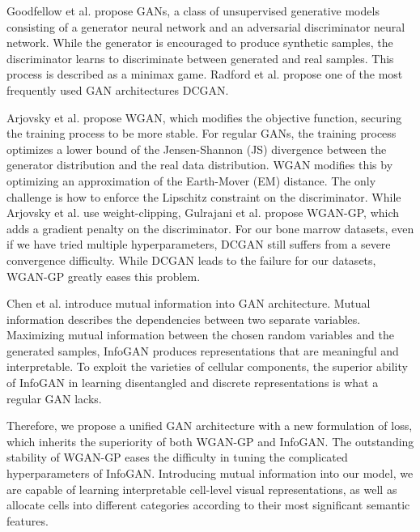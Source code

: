 \documentclass[journal]{IEEEtran}
\begin{document}
Goodfellow et al. \cite{goodfellow2014generative} propose GANs, a class of unsupervised generative models consisting of a generator neural network and an adversarial discriminator neural network. While the generator is encouraged to produce synthetic samples, the discriminator learns to discriminate between generated and real samples. This process is described as a minimax game. Radford et al. \cite{radford2015unsupervised} propose one of the most frequently used GAN architectures DCGAN.

Arjovsky et al. \cite{arjovsky2017wasserstein} propose WGAN, which modifies the objective function, securing the training process to be more stable. For regular GANs, the training process optimizes a lower bound of the Jensen-Shannon (JS) divergence between the generator distribution and the real data distribution. WGAN modifies this by optimizing an approximation of the Earth-Mover (EM) distance. The only challenge is how to enforce the Lipschitz constraint on the discriminator. While Arjovsky et al. \cite{arjovsky2017wasserstein} use weight-clipping, Gulrajani et al. \cite{gulrajani2017improved} propose WGAN-GP, which adds a gradient penalty on the discriminator. For our bone marrow datasets, even if we have tried multiple hyperparameters, DCGAN still suffers from a severe convergence difficulty. While DCGAN leads to the failure for our datasets, WGAN-GP greatly eases this problem.  

Chen et al. \cite{chen2016infoGAN} introduce mutual information into GAN architecture. Mutual information describes the dependencies between two separate variables. Maximizing mutual information between the chosen random variables and the generated samples, InfoGAN produces representations that are meaningful and interpretable. To exploit the varieties of cellular components, the superior ability of InfoGAN in learning disentangled and discrete representations is what a regular GAN lacks.

Therefore, we propose a unified GAN architecture with a new formulation of loss, which inherits the superiority of both WGAN-GP and InfoGAN. The outstanding stability of WGAN-GP eases the difficulty in tuning the complicated hyperparameters of InfoGAN. Introducing mutual information into our model, we are capable of learning interpretable cell-level visual representations, as well as allocate cells into different categories according to their most significant semantic features.

\end{document}
